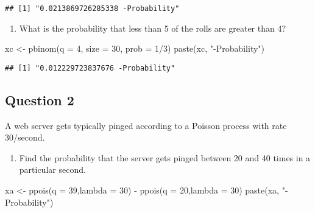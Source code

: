 \documentclass[
]{article}
\newenvironment{Shaded}{\begin{snugshade}}{\end{snugshade}}
\newcommand{\AttributeTok}[1]{\textcolor[rgb]{0.77,0.63,0.00}{#1}}
\newcommand{\DecValTok}[1]{\textcolor[rgb]{0.00,0.00,0.81}{#1}}
\newcommand{\FunctionTok}[1]{\textcolor[rgb]{0.00,0.00,0.00}{#1}}
\newcommand{\NormalTok}[1]{#1}
\newcommand{\OtherTok}[1]{\textcolor[rgb]{0.56,0.35,0.01}{#1}}
\newcommand{\SpecialCharTok}[1]{\textcolor[rgb]{0.00,0.00,0.00}{#1}}
\newcommand{\StringTok}[1]{\textcolor[rgb]{0.31,0.60,0.02}{#1}}
\providecommand{\tightlist}{%
  \setlength{\itemsep}{0pt}\setlength{\parskip}{0pt}}
\begin{document}
\begin{verbatim}
## [1] "0.0213869726285338 -Probability"
\end{verbatim}

\begin{enumerate}
\def\labelenumi{\alph{enumi}.}
\setcounter{enumi}{2}
\tightlist
\item
  What is the probability that less than 5 of the rolls are greater than
  4?
\end{enumerate}

\begin{Shaded}
\begin{Highlighting}[]
\NormalTok{xc }\OtherTok{\textless{}{-}} \FunctionTok{pbinom}\NormalTok{(}\AttributeTok{q =} \DecValTok{4}\NormalTok{, }\AttributeTok{size =} \DecValTok{30}\NormalTok{, }\AttributeTok{prob =} \DecValTok{1}\SpecialCharTok{/}\DecValTok{3}\NormalTok{)}
\FunctionTok{paste}\NormalTok{(xc, }\StringTok{"{-}Probability"}\NormalTok{)}
\end{Highlighting}
\end{Shaded}

\begin{verbatim}
## [1] "0.012229723837676 -Probability"
\end{verbatim}

\hypertarget{question-2}{%
\subsection{Question 2}\label{question-2}}

A web server gets typically pinged according to a Poisson process with
rate 30/second.

\begin{enumerate}
\def\labelenumi{\alph{enumi}.}
\tightlist
\item
  Find the probability that the server gets pinged between 20 and 40
  times in a particular second.
\end{enumerate}

\begin{Shaded}
\begin{Highlighting}[]
\NormalTok{xa }\OtherTok{\textless{}{-}} \FunctionTok{ppois}\NormalTok{(}\AttributeTok{q =} \DecValTok{39}\NormalTok{,}\AttributeTok{lambda =} \DecValTok{30}\NormalTok{) }\SpecialCharTok{{-}} \FunctionTok{ppois}\NormalTok{(}\AttributeTok{q =} \DecValTok{20}\NormalTok{,}\AttributeTok{lambda =} \DecValTok{30}\NormalTok{)}
\FunctionTok{paste}\NormalTok{(xa, }\StringTok{"{-}Probability"}\NormalTok{)}
\end{Highlighting}
\end{Shaded}
\end{document}
